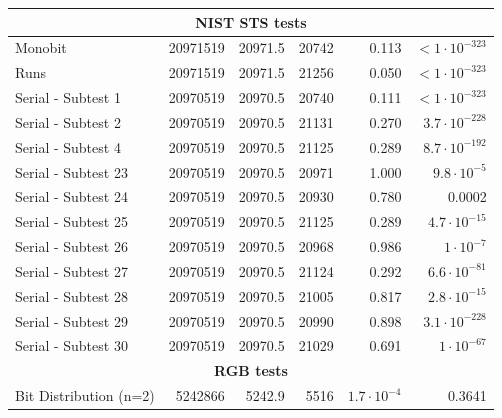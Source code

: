 \documentclass[
  digital,  	%
  color,		%
  oneside,   	%
  12pt,
  nocover,
  notable,
  nolof,
  nolot,
]{fithesis3}
\newcommand{\rd}{\cellcolor{red!40}}
\theoremstyle{definition}
\theoremstyle{remark}
\begin{document}
\begin{table}
\begin{nomar}
{\begin{tabular}{@{}lrrrrr@{}}
\multicolumn{6}{c}{\textbf{NIST STS tests}} \\ \midrule
Monobit                        & 20971519          & 20971.5       & 20742         & 0.113                  & $<1\cdot 10^{-323}$   \rd \\
Runs                           & 20971519          & 20971.5       & 21256         & 0.050                  & $<1\cdot 10^{-323}$   \rd \\ 
Serial - Subtest 1             & 20970519          & 20970.5       & 20740         & 0.111                  & $<1\cdot 10^{-323}$   \rd \\
Serial - Subtest 2             & 20970519          & 20970.5       & 21131         & 0.270                  & $3.7 \cdot 10^{-228}$ \rd \\ 
Serial - Subtest 4             & 20970519          & 20970.5       & 21125         & 0.289                  & $8.7 \cdot 10^{-192}$ \rd \\ 
Serial - Subtest 23            & 20970519          & 20970.5       & 20971         & 1.000                  & $9.8 \cdot 10^{-5}$   \rd \\ 
Serial - Subtest 24            & 20970519          & 20970.5       & 20930         & 0.780                  & 0.0002                \rd \\ 
Serial - Subtest 25            & 20970519          & 20970.5       & 21125         & 0.289                  & $4.7 \cdot 10^{-15}$  \rd \\
Serial - Subtest 26            & 20970519          & 20970.5       & 20968         & 0.986                  & $1 \cdot 10^{-7}$     \rd \\
Serial - Subtest 27            & 20970519          & 20970.5       & 21124         & 0.292                  & $6.6 \cdot 10^{-81}$  \rd \\
Serial - Subtest 28            & 20970519          & 20970.5       & 21005         & 0.817                  & $2.8 \cdot 10^{-15}$  \rd \\
Serial - Subtest 29            & 20970519          & 20970.5       & 20990         & 0.898                  & $3.1 \cdot 10^{-228}$ \rd \\
Serial - Subtest 30            & 20970519          & 20970.5       & 21029         & 0.691                  & $1 \cdot 10^{-67}$    \rd \\ \midrule
\multicolumn{6}{c}{\textbf{RGB tests}} \\ \midrule
Bit Distribution (n=2)         & 5242866           & 5242.9        & 5516          & $1.7\cdot 10^{-4}$ \rd & 0.3641                \\

\end{tabular}}
\end{nomar}
\end{table}
\end{document}
